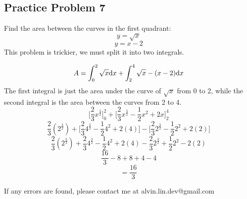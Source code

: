 \documentclass[letterpaper, 12pt]{math}
\begin{document}
\subsection*{Practice Problem 7}
Find the area between the curves in the first quadrant:
\[ y = \sqrt{x} \]
\[ y = x-2 \]
This problem is trickier, we must split it into two integrals.
\begin{center}
\end{center}
\[ A = \int_{0}^{2}{\sqrt{x}\mathrm{d}{x}}+\int_{2}^{4}{\sqrt{x}-(x-2)\mathrm{d}{x}} \]
The first integral is just the area under the curve of \( \sqrt{x} \) from 0 to
2, while the second integral is the area between the curves from 2 to 4.
\[ \bigg[\frac{2}{3}x^{\frac{3}{2}}\bigg]_{0}^{2}+
   \bigg[\frac{2}{3}x^{\frac{3}{2}}-\frac{1}{2}x^{2}+2x\bigg]_{2}^{4} \]
\[ \frac{2}{3}(2^{\frac{3}{2}})+
   \bigg[\frac{2}{3}4^{\frac{3}{2}}-\frac{1}{2}4^{2}+2(4)\bigg]-
   \bigg[\frac{2}{3}2^{\frac{3}{2}}-\frac{1}{2}2^{2}+2(2)\bigg] \]
\[ \frac{2}{3}(2^{\frac{3}{2}})+
   \frac{2}{3}4^{\frac{3}{2}}-\frac{1}{2}4^{2}+2(4)-
   \frac{2}{3}2^{\frac{3}{2}}+\frac{1}{2}2^{2}-2(2) \]
\[ \frac{16}{3}-8+8+4-4 \]
\[  = \frac{16}{3} \]

\begin{center}
  If any errors are found, please contact me at alvin.lin.dev@gmail.com
\end{center}
\end{document}
